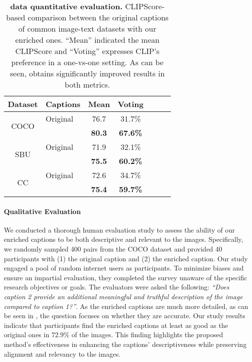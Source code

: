 \begin{table}[b]
  \centering
  \vspace{-9pt}
  \begin{tabular}{clccccc}
  \toprule
    Dataset & Captions & Mean & Voting  \\
    \midrule
    \multirow{2}{*}{COCO} & Original & 76.7 & 31.7\%\\
& \fusecap{} & \textbf{80.3} & \textbf{67.6\%} \\
    \midrule
    \multirow{2}{*}{SBU} & Original & 71.9 & 32.1\%\\
& \fusecap{} & \textbf{75.5} & \textbf{60.2\%} \\
    \midrule
    \multirow{2}{*}{CC} & Original & 72.6 & 34.7\%\\
& \fusecap{} & \textbf{75.4} & \textbf{59.7\%} \\
    \bottomrule
  \end{tabular}
\caption{\textbf{\fusecap{} data quantitative evaluation.} CLIPScore-based comparison between the original captions of common image-text datasets with our enriched ones. ``Mean'' indicated the mean CLIPScore and ``Voting'' expresses CLIP's preference in a one-vs-one setting. As can be seen, \fusecap{} obtains significantly improved results in both metrics.}
    \label{tab:caption_clips}
\end{table}





\paragraph{Qualitative Evaluation}
We conducted a thorough human evaluation study to assess the ability of our enriched captions to be both descriptive and relevant to the images. Specifically, we randomly sampled 400 pairs from the COCO dataset 
and provided 40 participants with (1) the original caption and (2) the enriched caption.
Our study engaged a pool of random internet users as participants. To minimize biases and ensure an impartial evaluation, they completed the survey unaware of the specific research objectives or goals.
The evaluators were asked the following:
\textit{``Does caption 2 provide an additional meaningful and truthful description of the image compared to caption 1?''}.
As the enriched captions are much more detailed, as can be seen in , the question focuses on whether they are accurate.
Our study results indicate that participants find the enriched captions at least as good as the original ones in $72.9\%$ of the images. This finding highlights the proposed method's effectiveness in enhancing the captions' descriptiveness while preserving alignment and relevancy to the images.


